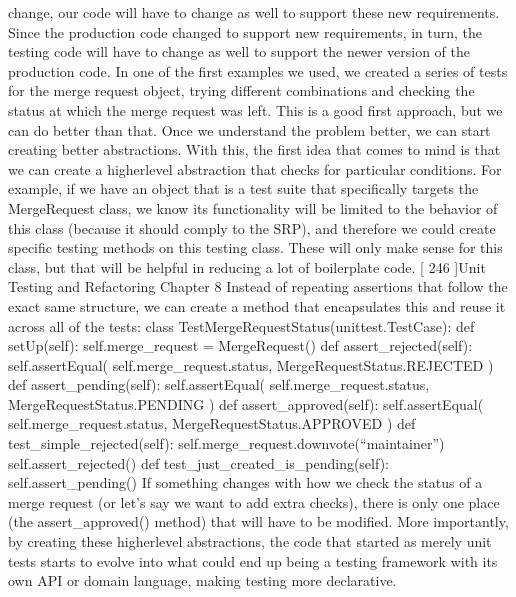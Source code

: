 \documentclass[a4paper,10pt,english]{sphinxmanual}
\begin{document}
change, our code will have to change as well to support these new requirements. Since the
production code changed to support new requirements, in turn, the testing code will have
to change as well to support the newer version of the production code.
In one of the first examples we used, we created a series of tests for the merge request
object, trying different combinations and checking the status at which the merge request
was left. This is a good first approach, but we can do better than that.
Once we understand the problem better, we can start creating better abstractions. With this,
the first idea that comes to mind is that we can create a higher\sphinxhyphen{}level abstraction that checks
for particular conditions. For example, if we have an object that is a test suite that
specifically targets the MergeRequest class, we know its functionality will be limited to the
behavior of this class (because it should comply to the SRP), and therefore we could create
specific testing methods on this testing class. These will only make sense for this class, but
that will be helpful in reducing a lot of boilerplate code.
{[} 246 {]}Unit Testing and Refactoring
Chapter 8
Instead of repeating assertions that follow the exact same structure, we can create a method
that encapsulates this and reuse it across all of the tests:
class TestMergeRequestStatus(unittest.TestCase):
def setUp(self):
self.merge\_request = MergeRequest()
def assert\_rejected(self):
self.assertEqual(
self.merge\_request.status, MergeRequestStatus.REJECTED
)
def assert\_pending(self):
self.assertEqual(
self.merge\_request.status, MergeRequestStatus.PENDING
)
def assert\_approved(self):
self.assertEqual(
self.merge\_request.status, MergeRequestStatus.APPROVED
)
def test\_simple\_rejected(self):
self.merge\_request.downvote(“maintainer”)
self.assert\_rejected()
def test\_just\_created\_is\_pending(self):
self.assert\_pending()
If something changes with how we check the status of a merge request (or let’s say we want
to add extra checks), there is only one place (the assert\_approved() method) that will
have to be modified. More importantly, by creating these higher\sphinxhyphen{}level abstractions, the code
that started as merely unit tests starts to evolve into what could end up being a testing
framework with its own API or domain language, making testing more declarative.
\end{document}
